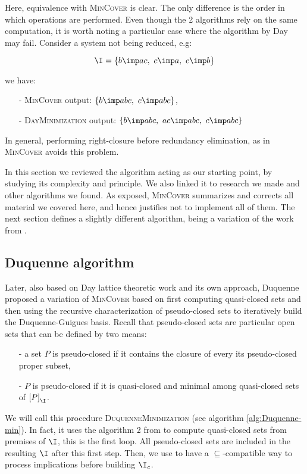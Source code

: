 \noindent Here, equivalence with \textsc{MinCover} is clear. The only difference
is the order in which operations are performed. Even though the 2 algorithms 
rely on the same computation, it is worth noting a particular case where the
algorithm by Day may fail. Consider a system not being reduced, e.g:

\[ \I =  \{ b \imp ac, \ c \imp a, \  c \imp b \} \]

\noindent we have:
\begin{itemize}
	\item[-] \textsc{MinCover} output: $\{ b \imp abc, \ c \imp abc \}$,
	\item[-] \textsc{DayMinimization} output: $ \{ b \imp abc, \ ac \imp abc, \  c \imp abc \}$
\end{itemize}
In general, performing right-closure before redundancy elimination, as in 
\textsc{MinCover} avoids this problem. 

\vspace{1.2em}

In this section we reviewed the algorithm acting as our starting point, by 
studying its complexity and principle. We also linked it to research we made
and other algorithms we found. As exposed, \textsc{MinCover} summarizes and 
corrects all material we covered here, and hence justifies not to implement
all of them. The next section defines a slightly different algorithm, being a
variation of the work from \cite{day_lattice_1992}.

\subsection{Duquenne algorithm}

Later, also based on Day lattice theoretic work and its own approach, Duquenne
proposed a variation of \textsc{MinCover} based on first computing quasi-closed
sets and then using the recursive characterization of pseudo-closed sets to iteratively build the Duquenne-Guigues basis. Recall that pseudo-closed sets
are particular open sets that can be defined by two means:
\begin{itemize}
	\item[-] a set $P$ is pseudo-closed if it contains the closure of every its
	pseudo-closed proper subset,
	\item[-] $P$ is pseudo-closed if it is quasi-closed and minimal among quasi-closed sets of $\left[ P \right]_{\I}$.
\end{itemize}
We will call this procedure \textsc{DuquenneMinimization} (see algorithm \ref{alg:Duquenne-min}). In fact, it uses the algorithm 2 from \cite{day_lattice_1992} to compute quasi-closed sets from premises of $\I$,
this is the first loop. All pseudo-closed sets are included in the resulting $\I$ after this first step. Then, we use  to have a $\subseteq$-compatible way to process implications before building $\I_c$.


